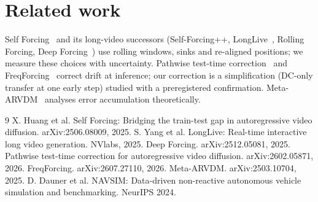 \documentclass[11pt]{article}
\begin{document}
\section{Related work}
Self Forcing~\cite{selfforcing} and its long-video successors (Self-Forcing++, LongLive~\cite{longlive}, Rolling
Forcing, Deep Forcing~\cite{deepforcing}) use rolling windows, sinks and re-aligned positions; we measure these choices
with uncertainty. Pathwise test-time correction~\cite{pathwise} and FreqForcing~\cite{freqforcing} correct drift at
inference; our correction is a simplification (DC-only transfer at one early step) studied with a preregistered
confirmation. Meta-ARVDM~\cite{metaarvdm} analyses error accumulation theoretically.

\begin{thebibliography}{9}\small
{} X. Huang et al. Self Forcing: Bridging the train-test gap in autoregressive video diffusion. arXiv:2506.08009, 2025.
 S. Yang et al. LongLive: Real-time interactive long video generation. NVlabs, 2025.
 Deep Forcing. arXiv:2512.05081, 2025.
 Pathwise test-time correction for autoregressive video diffusion. arXiv:2602.05871, 2026.
 FreqForcing. arXiv:2607.27110, 2026.
 Meta-ARVDM. arXiv:2503.10704, 2025.
 D. Dauner et al. NAVSIM: Data-driven non-reactive autonomous vehicle simulation and benchmarking. NeurIPS 2024.
\end{thebibliography}
\end{document}
